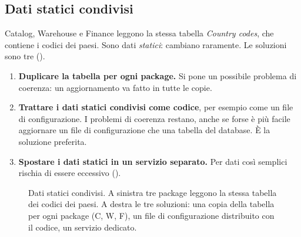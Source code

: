 \subsection{Dati statici condivisi}
\label{sec:split-statici}

Catalog, Warehouse e Finance leggono la stessa tabella \emph{Country codes}, che contiene i codici dei paesi. Sono
dati \emph{statici}: cambiano raramente. Le soluzioni sono tre ().
\begin{enumerate}
  \item \textbf{Duplicare la tabella per ogni package.} Si pone un possibile problema di coerenza: un aggiornamento va
    fatto in tutte le copie.
  \item \textbf{Trattare i dati statici condivisi come codice}, per esempio come un file di configurazione. I problemi
    di coerenza restano, anche se forse è più facile aggiornare un file di configurazione che una tabella del
    database. È la soluzione preferita.
  \item \textbf{Spostare i dati statici in un servizio separato.} Per dati così semplici rischia di essere eccessivo
    ().
\end{enumerate}

\begin{figure}[ht]
\centering
{}
\caption{Dati statici condivisi. A sinistra tre package leggono la stessa tabella dei codici dei paesi. A destra le tre
soluzioni: una copia della tabella per ogni package (C, W, F), un file di configurazione distribuito con il codice, un
servizio dedicato.}
\label{fig:split-statici}
\end{figure}

